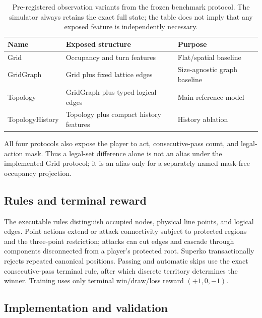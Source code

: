 \documentclass{article}
\begin{document}
\begin{table}[t]
  \centering
  \caption{Pre-registered observation variants from the frozen benchmark
  protocol. The simulator always retains the exact full state; the table does
  not imply that any exposed feature is independently necessary.}
  \label{tab:observations}
  \begin{tabular}{lll}
    \toprule
    Name & Exposed structure & Purpose \\
    \midrule
    Grid & Occupancy and turn features & Flat/spatial baseline \\
    GridGraph & Grid plus fixed lattice edges & Size-agnostic graph baseline \\
    Topology & GridGraph plus typed logical edges & Main reference model \\
    TopologyHistory & Topology plus compact history features & History ablation \\
    \bottomrule
  \end{tabular}
\end{table}

All four protocols also expose the player to act, consecutive-pass count, and
legal-action mask. Thus a legal-set difference alone is not an alias under the
implemented Grid protocol; it is an alias only for a separately named
mask-free occupancy projection.

\subsection{Rules and terminal reward}

The executable rules distinguish occupied nodes, physical line points, and
logical edges. Point actions extend or attack connectivity subject to protected
regions and the three-point restriction; attacks can cut edges and cascade
through components disconnected from a player's protected root. Superko
transactionally rejects repeated canonical positions. Passing and automatic
skips use the exact consecutive-pass terminal rule, after which discrete
territory determines the winner. Training uses only terminal win/draw/loss
reward $(+1,0,-1)$.

\subsection{Implementation and validation}
\end{document}
